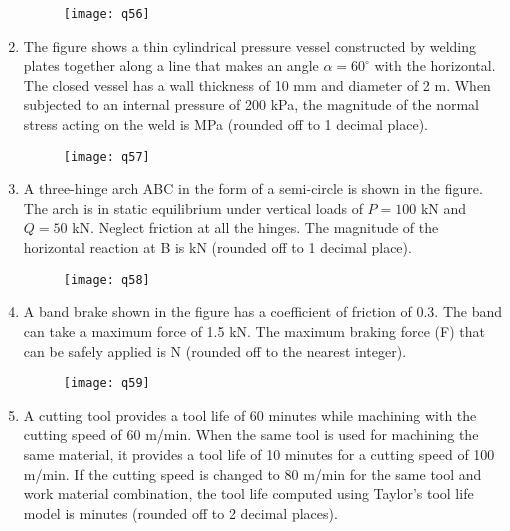 \documentclass[journal,11pt,onecolumn]{IEEEtran}
\begin{document}
\begin{enumerate}[resume]
          \begin{figure}[H]
              \centering
              \texttt{[image: q56]}
              \caption{}
              \label{fig:q56}
          \end{figure}

    \item The figure shows a thin cylindrical pressure vessel constructed by welding plates together along a line that makes an angle $\alpha = 60^\circ$ with the horizontal. The closed vessel has a wall thickness of 10 mm and diameter of 2 m. When subjected to an internal pressure of 200 kPa, the magnitude of the normal stress acting on the weld is \underline{\hspace{2cm}} MPa (rounded off to 1 decimal place).

          \begin{figure}[H]
              \centering
              \texttt{[image: q57]}
              \caption{}
              \label{fig:q57}
          \end{figure}

    \item A three-hinge arch ABC in the form of a semi-circle is shown in the figure. The arch is in static equilibrium under vertical loads of $P = 100$ kN and $Q = 50$ kN. Neglect friction at all the hinges. The magnitude of the horizontal reaction at B is \underline{\hspace{2cm}} kN (rounded off to 1 decimal place).

          \begin{figure}[H]
              \centering
              \texttt{[image: q58]}
              \caption{}
              \label{fig:q58}
          \end{figure}

    \item A band brake shown in the figure has a coefficient of friction of 0.3. The band can take a maximum force of 1.5 kN. The maximum braking force (F) that can be safely applied is \underline{\hspace{2cm}} N (rounded off to the nearest integer).

          \begin{figure}[H]
              \centering
              \texttt{[image: q59]}
              \caption{}
              \label{fig:q59}
          \end{figure}

    \item A cutting tool provides a tool life of 60 minutes while machining with the cutting speed of 60 m/min. When the same tool is used for machining the same material, it provides a tool life of 10 minutes for a cutting speed of 100 m/min. If the cutting speed is changed to 80 m/min for the same tool and work material combination, the tool life computed using Taylor's tool life model is \underline{\hspace{2cm}} minutes (rounded off to 2 decimal places).


\end{enumerate}
\end{document}
